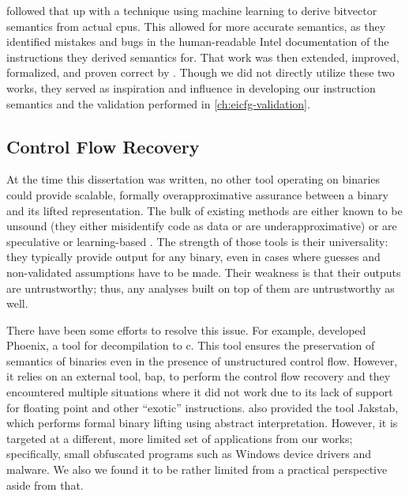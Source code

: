 \Textcite{heule2016stratified} followed that up with a technique using machine learning to derive bitvector semantics from actual \acp{cpu}.
This allowed for more accurate semantics, as they identified mistakes and bugs in the human-readable Intel documentation of the instructions they derived semantics for.
That work was then extended, improved, formalized, and proven correct by \textcite{roessle2019verified}.
Though we did not directly utilize these two works, they served as inspiration and influence in developing our instruction semantics and the validation performed in \cref{ch:eicfg-validation}.

\subsection{Control Flow Recovery}
At the time this dissertation was written, no other tool operating on binaries could provide scalable, formally overapproximative assurance between a binary and its lifted representation.
The bulk of existing methods are either known to be unsound (they either misidentify code as data or are underapproximative) \autocite{schwartz2002disassembly} or are speculative or learning-based \autocite{wartell2011differentiating,khadra2016speculative,katz2018recurrent}.
The strength of those tools is their universality: they typically provide output for any binary, even in cases where guesses and non-validated assumptions have to be made.
Their weakness is that their outputs are untrustworthy; thus, any analyses built on top of them are untrustworthy as well.

There have been some efforts to resolve this issue.
For example, \textcite{brumley2013native} developed Phoenix, a tool for decompilation to \gls{c}.
This tool ensures the preservation of semantics of binaries even in the presence of unstructured control flow.
However, it relies on an external tool, \ac{bap}, to perform the control flow recovery and they encountered multiple situations where it did not work due to its lack of support for floating point and other ``exotic'' instructions.
\Textcite{kinder2010static,kinder2012alternating,kinder2012virtualization} also provided the tool Jakstab, which performs formal binary lifting using abstract interpretation.
However, it is targeted at a different, more limited set of applications from our works; specifically, small obfuscated programs such as Windows device drivers and malware.
We also we found it to be rather limited from a practical perspective aside from that.


